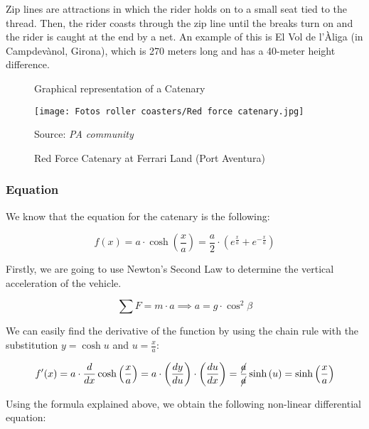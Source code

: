 \documentclass[12pt,twoside,a4paper]{article}
\newcommand{\ds}{\displaystyle}
\newcommand{\source}[1]{\caption*{Source: \textit{#1}} }
\begin{document}
	Zip lines are attractions in which the rider holds on to a small seat tied to the thread. Then, the rider coasts through the zip line until the breaks turn on and the rider is caught at the end by a net. An example of this is El Vol de l'Àliga (in Campdevànol, Girona), which is 270 meters long and has a 40-meter height difference.
	
	\begin{figure}[H]
		\centering
		\caption{Graphical representation of a Catenary}
		\label{graph:Catenary}
	\end{figure}

	\begin{figure}[H]
		\centering
		\texttt{[image: Fotos roller coasters/Red force catenary.jpg]}
		\caption{Red Force Catenary at Ferrari Land (Port Aventura)}
		\label{fig:Catenary}
		\source{PA community}
	\end{figure}
	
	\subsubsection{Equation}
	We know that the equation for the catenary is the following:
	
	$$\ds f(x) = a \cdot \cosh{\left(\frac{x}{a}\right)} = \frac{a}{2} \cdot \left(e^{\frac{x}{a}} + e^{-\frac{x}{a}}\right)$$
	
	Firstly, we are going to use Newton's Second Law to determine the vertical acceleration of the vehicle.
	
	$$\sum F = m \cdot a \implies a = g \cdot \cos^2\beta$$
	
	We can easily find the derivative of the function by using the chain rule with the substitution $y = \cosh u$ and $\ds u = \frac{x}{a}$:
	
	$$f'(x) = a \cdot \frac{d}{dx} \cosh{\left(\frac{x}{a}\right)} = a \cdot \left(\frac{dy}{du}\right) \cdot \left(\frac{du}{dx}\right) = \frac{\cancel{a}}{\cancel{a}} \sinh{\left(u\right)} = \sinh{\left(\frac{x}{a}\right)}$$
	
	Using the formula explained above, we obtain the following non-linear differential equation:
	
\end{document}
